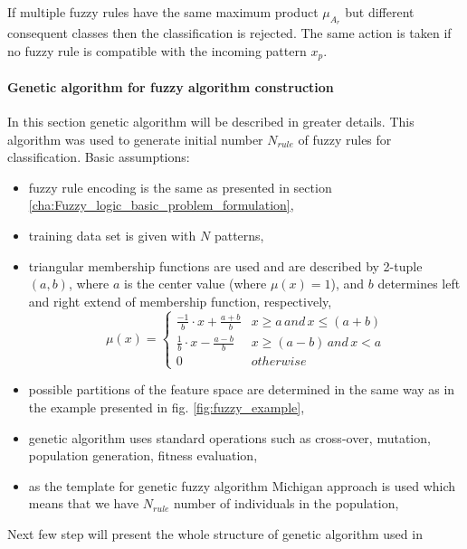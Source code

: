 If multiple fuzzy rules have the same maximum product $\mu_{A_r}$ but different
consequent classes then the classification is rejected. The same action is
taken if no fuzzy rule is compatible with the incoming pattern $x_p$.

\paragraph{Genetic algorithm for  fuzzy algorithm construction}
\label{cha:Fuzzy_logic_genetic_algorithm}
In this section genetic algorithm will be described in greater details. This
algorithm was used to generate initial number $N_{rule}$ of fuzzy rules for
classification. 
Basic assumptions:
\begin{itemize}
    \item fuzzy rule encoding is the same as presented in section
        \ref{cha:Fuzzy_logic_basic_problem_formulation},
    \item training data set is given with $N$ patterns,
    \item triangular membership functions are used and are described by 2-tuple
        $(a, b)$, where $a$ is the center value (where $\mu(x)=1$), and
        $b$ determines left and right extend of membership function,
        respectively,
        \begin{equation}
            \mu(x) = 
            \begin{cases}
                \frac{-1}{b}\cdot x + \frac{a+b}{b} &
                x \geq a \, and \, x \leq (a+b) \\
                \frac{1}{b}\cdot x - \frac{a-b}{b} &
                x \geq (a - b)\, and\, x < a \\
                0 & otherwise
            \end{cases}
            \label{eq:fuzzy_function}
        \end{equation}
    \item possible partitions of the feature space are determined in the same
        way as in the example presented in fig. \ref{fig:fuzzy_example},
    \item genetic algorithm uses standard operations such as cross-over,
        mutation, population generation, fitness evaluation,
    \item as the template for genetic fuzzy algorithm Michigan approach is
        used which means that we have $N_{rule}$ number of individuals in the
        population,
\end{itemize}
Next few step will present the whole structure of genetic algorithm used in
